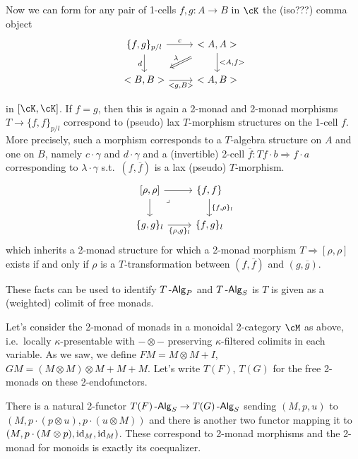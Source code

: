 \documentclass[a4paper,11pt,oneside,openany]{scrbook}
\begin{document}
Now we can form for any pair of 1-cells $f,g\colon A\rightarrow B$ in $\cK$ the
(iso???) comma object
\[\begin{tikzcd}
	{\{f,g\}_{p/l}} & {<A,A>} \\
	{<B,B>} & {<A,B>}
	\arrow["d"', from=1-1, to=2-1]
	\arrow["{<A,f>}", from=1-2, to=2-2]
	\arrow["c", from=1-1, to=1-2]
	\arrow["{<g,B>}"', from=2-1, to=2-2]
	\arrow["\lambda"', shorten <=10pt, shorten >=10pt, Rightarrow, from=1-2, to=2-1]
\end{tikzcd}\]

in $[\cK,\cK]$. If $f=g$, then this is again a 2-monad and 2-monad morphisms
$T\rightarrow\{f,f\}_{p/l}$ correspond to (pseudo) lax $T$-morphism structures
on the 1-cell $f$. More precisely, such a morphism corresponds to a $T$-algebra
structure on $A$ and one on $B$, namely $c\cdot\gamma$ and $d\cdot\gamma$ and a
(invertible) 2-cell $\overline{f}\colon Tf\cdot b\Rightarrow f\cdot a$
corresponding to $\lambda\cdot\gamma$ s.t.\ $(f,\overline{f})$ is a lax (pseudo)
$T$-morphism.
\[\begin{tikzcd}
	{[\rho,\rho]} & {\{f,f\}} \\
	{\{g,g\}_l} & {\{f,g\}_l}
	\arrow["{\{f,\rho\}_l}", from=1-2, to=2-2]
	\arrow[from=1-1, to=1-2]
	\arrow["{\{\rho,g\}_l}"', from=2-1, to=2-2]
	\arrow[from=1-1, to=2-1]
	\arrow["\lrcorner"{anchor=center, pos=0.125}, draw=none, from=1-1, to=2-2]
\end{tikzcd}\]
which inherits a 2-monad structure for which a 2-monad morphism $T\Rightarrow
[\rho,\rho]$ exists if and only if $\rho$ is a $T$-transformation between
$(f,\overline{f})$ and $(g,\overline{g})$.

These facts can be used to identify $T\operatorname{-\mathsf{Alg}}_P$ and $T\operatorname{-\mathsf{Alg}}_S$ is $T$ is given as a
(weighted) colimit of free monads.

\begin{exmp}
    Let's consider the 2-monad of monads in a monoidal 2-category $\cM$ as
    above, i.e.\ locally $\kappa$-presentable with $-\otimes-$ preserving
    $\kappa$-filtered colimits in each variable. As we saw, we define
    $FM=M\otimes M+I$, $GM=(M\otimes M)\otimes M+M+M$. Let's write $T(F)$,
    $T(G)$ for the free 2-monads on these 2-endofunctors.

    There is a natural 2-functor $T(F)\operatorname{-\mathsf{Alg}}_S\rightarrow T(G)\operatorname{-\mathsf{Alg}}_S$ sending
    $(M,p,u)$ to $(M,p\cdot(p\otimes u),p\cdot(u\otimes M))$ and there is
    another two functor mapping it to $(M,p\cdot(M\otimes p),\operatorname{id}_M,\operatorname{id}_M)$.
    These correspond to 2-monad morphisms and the 2-monad for monoids is exactly
    its coequalizer.
\end{exmp}
\end{document}
